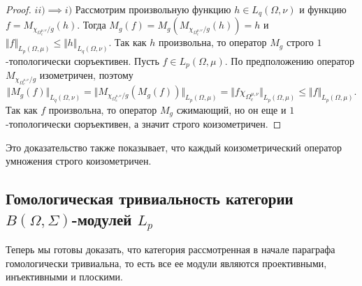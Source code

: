 \begin{proof}
$ii)$$\implies$$ i)$ Рассмотрим произвольную функцию $h\in L_q(\Omega,\nu)$ и функцию $f=M_{\chi_{\Omega_c^{\mu,\nu}}/g}(h)$. Тогда $M_g(f)=M_g(M_{\chi_{\Omega_c^{\mu,\nu}}/g}(h))=h$ и $\Vert f\Vert_{L_p(\Omega,\mu)}\leq\Vert h\Vert_{L_q(\Omega,\nu)}$. Так как $h$ произвольна, то оператор $M_g$ строго $1$-топологически сюръективен. Пусть $f\in L_p(\Omega,\mu)$. По предположению оператор $M_{\chi_{\Omega_c^{\mu,\nu}}/g}$ изометричен, поэтому 
$$
\Vert M_g(f)\Vert_{L_q(\Omega,\nu)}
=\Vert M_{\chi_{\Omega_c^{\mu,\nu}}/g}(M_g(f))\Vert_{L_p(\Omega,\mu)}
=\Vert f\chi_{\Omega_c^{\mu,\nu}}\Vert_{L_p(\Omega,\mu)}
\leq\Vert f\Vert_{L_p(\Omega,\mu)}.
$$
Так как $f$ произвольна, то оператор $M_g$ сжимающий, но он еще и $1$-топологически сюръективен, а значит строго коизометричен.
\end{proof}

Это доказательство также показывает, что каждый коизометрический оператор умножения строго коизометричен.




\subsection{Гомологическая тривиальность категории \texorpdfstring{$B(\Omega,\Sigma)$-модулей $L_p$}{B(Omega)-модулей Lp}}
\label{SubSectionHomologicalTrivialityOfTheCategoryBOmegaSigmaModulesLp}

Теперь мы готовы доказать, что категория рассмотренная в начале параграфа гомологически тривиальна, то есть все ее модули являются проективными, инъективными и плоскими.

